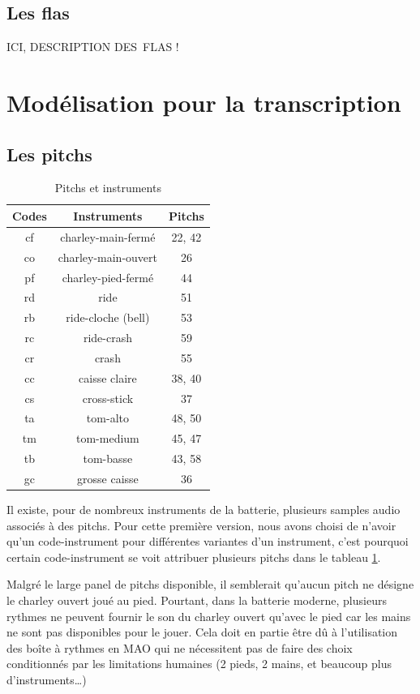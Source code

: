 \subsection*{Les flas}
ICI, DESCRIPTION DES FLAS !
\section{Modélisation pour la transcription}
\label{modelisation_transcription}
\subsection*{Les pitchs}
\begin{table}[h]
	\centering
	\begin{tabular}{|c|c|c|} \hline
		Codes & Instruments & Pitchs \\ \hline
		cf & charley-main-fermé & 22, 42 \\
		co & charley-main-ouvert & 26 \\
		pf & charley-pied-fermé & 44 \\
		rd & ride & 51 \\
		rb & ride-cloche (bell) & 53 \\
		rc & ride-crash & 59 \\
		cr & crash & 55 \\
		cc & caisse claire & 38, 40 \\
		cs & cross-stick & 37 \\
		ta & tom-alto & 48, 50 \\
		tm & tom-medium & 45, 47 \\
		tb & tom-basse & 43, 58 \\
		gc & grosse caisse & 36 \\ \hline
	\end{tabular}
	\caption{Pitchs et instruments}
	\label{pitchs_instru}
\end{table}

Il existe, pour de nombreux instruments de la batterie, plusieurs samples audio associés à des pitchs. 
Pour cette première version, nous avons choisi de n’avoir qu’un code-instrument pour différentes variantes d’un instrument, c’est pourquoi certain code-instrument se voit attribuer plusieurs pitchs dans le tableau \ref{pitchs_instru}.

Malgré le large panel de pitchs disponible, il semblerait qu’aucun pitch ne désigne le charley ouvert joué au pied. Pourtant, dans la batterie moderne, plusieurs rythmes ne peuvent fournir le son du charley ouvert qu’avec le pied car les mains ne sont pas disponibles pour le jouer. Cela doit en partie être dû à l’utilisation des boîte à rythmes en MAO qui ne nécessitent pas de faire des choix conditionnés par les limitations humaines (2 pieds, 2 mains, et beaucoup plus d’instruments…)


